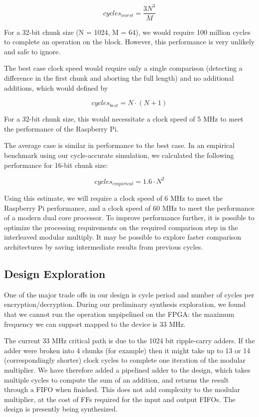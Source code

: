 \documentclass[12pt]{article}
\begin{document}
\begin{equation}
cycles_{worst}=\frac{3N^{3}}{M}
\end{equation}

For a 32-bit chunk size (N = 1024, M = 64), we would require 100 million cycles
to complete an operation on the block. However, this performance is very unlikely and
safe to ignore. 

The best case clock speed would require only a single comparison (detecting a difference
in the first chunk and aborting the full length) and no additional additions,
which would defined by

\begin{equation}
cycles_{best}=N\cdot (N+1)
\end{equation}

For a 32-bit chunk size, this would necessitate a clock speed of 5 MHz to meet the
performance of the Raspberry Pi.

The average case is similar in performance to the best case. In an empirical benchmark
using our cycle-accurate simulation, we calculated the following performance for 16-bit
chunk size:

\begin{equation}
cycles_{empirical}=1.6\cdot{N}^2
\end{equation}

Using this estimate, we will require a clock speed of 6 MHz to meet the Raspberry Pi performance, and
a clock speed of 60 MHz to meet the performance of a modern dual core processor. To improve performance further, 
it is possible to optimize the processing requirements on the required comparison step in the interleaved
modular multiply. It may be possible to explore faster comparison architectures by saving intermediate 
results from previous cycles.

\subsection{Design Exploration}
One of the major trade offs in our design is cycle period and number of cycles per encryption/decryption. 
During our preliminary synthesis exploration, we found that we cannot run the operation unpipelined on the FPGA:
the maximum frequency we can support mapped to the device is 33 MHz.

The current 33 MHz critical path is due to the 1024 bit ripple-carry adders. If the adder were broken 
into 4 chunks (for example) then it might take up to 13 or 14 (correspondingly shorter) clock cycles to complete 
one iteration of the modular multiplier. We have therefore added a pipelined adder to the design, which takes multiple
cycles to compute the sum of an addition, and returns the result through a FIFO when finished. This does not
add complexity to the modular multiplier, at the cost of FFs required for the input and output FIFOs. The
design is presently being synthesized. 
\end{document}
